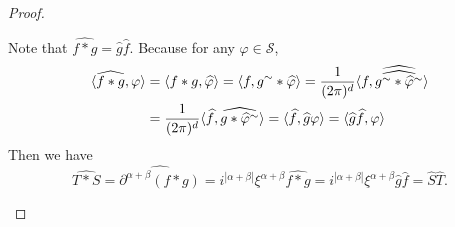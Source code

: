 \begin{enumerate}
\begin{proof}
\begin{enumerate}
			\noindent Note that $\widehat{f*g} = \widehat{g}\widehat{f}$. Because for any $\varphi \in \mathcal{S}$,
			\begin{equation*}
				\begin{aligned}
					\langle \widehat{f * g},\varphi \rangle &= \langle f * g, \widehat{\varphi} \rangle = \langle f,g^\sim * \widehat{\varphi} \rangle = \frac{1}{(2\pi)^d}\langle f,\widehat{\widehat{g^\sim * \widehat{\varphi}^\sim}} \rangle \\
					&= \frac{1}{(2\pi)^d} \langle \widehat{f},\widehat{g*\widehat{\varphi}^\sim} \rangle = \langle \widehat{f},\widehat{g}\varphi \rangle = \langle \widehat{g}\widehat{f},\varphi \rangle
				\end{aligned}
			\end{equation*}
			Then we have
			\begin{equation*}
				\widehat{T * S}=\widehat{\partial^{\alpha+\beta}(f * g)}=i^{|\alpha+\beta|} \xi^{\alpha+\beta}\widehat{f * g}=i^{|\alpha+\beta|} \xi^{\alpha+\beta} \widehat{g} \widehat{f}=\widehat{S} \widehat{T} .
			\end{equation*}
		\end{enumerate}
	\end{proof}
\end{enumerate}
